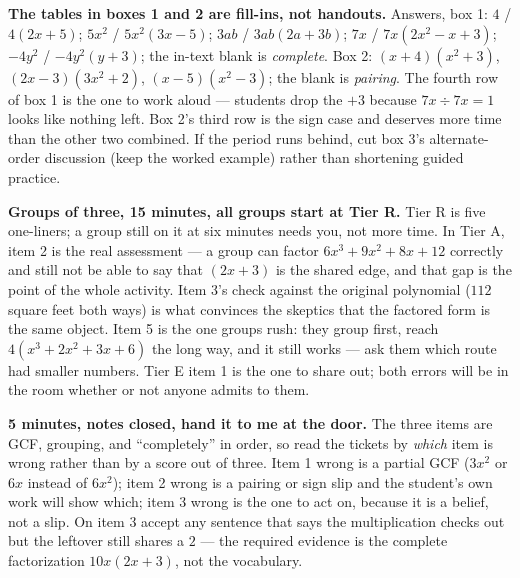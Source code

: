 \documentclass[10pt]{article}
\begin{document}
\begin{teachernote}
    \textbf{The tables in boxes 1 and 2 are fill-ins, not handouts.} Answers, box 1: $4$ /
    $4(2x+5)$; $5x^2$ / $5x^2(3x-5)$; $3ab$ / $3ab(2a+3b)$; $7x$ / $7x\left(2x^2-x+3\right)$;
    $-4y^2$ / $-4y^2(y+3)$; the in-text blank is \emph{complete}. Box 2: $(x+4)\left(x^2+3\right)$,
    $(2x-3)\left(3x^2+2\right)$, $(x-5)\left(x^2-3\right)$; the blank is \emph{pairing}. The fourth
    row of box 1 is the one to work aloud --- students drop the $+3$ because $7x \div 7x = 1$ looks
    like nothing left. Box 2's third row is the sign case and deserves more time than the other two
    combined. If the period runs behind, cut box 3's alternate-order discussion (keep the worked
    example) rather than shortening guided practice.
\end{teachernote}

\begin{teachernote}
    \textbf{Groups of three, 15 minutes, all groups start at Tier R.} Tier R is five one-liners; a
    group still on it at six minutes needs you, not more time. In Tier A, item 2 is the real
    assessment --- a group can factor $6x^3+9x^2+8x+12$ correctly and still not be able to say that
    $(2x+3)$ is the shared edge, and that gap is the point of the whole activity. Item 3's check
    against the original polynomial ($112$ square feet both ways) is what convinces the skeptics
    that the factored form is the same object. Item 5 is the one groups rush: they group first,
    reach $4\left(x^3+2x^2+3x+6\right)$ the long way, and it still works --- ask them which route
    had smaller numbers. Tier E item 1 is the one to share out; both errors will be in the room
    whether or not anyone admits to them.
\end{teachernote}

\begin{teachernote}
    \textbf{5 minutes, notes closed, hand it to me at the door.} The three items are GCF, grouping,
    and ``completely'' in order, so read the tickets by \emph{which} item is wrong rather than by a
    score out of three. Item 1 wrong is a partial GCF ($3x^2$ or $6x$ instead of $6x^2$); item 2
    wrong is a pairing or sign slip and the student's own work will show which; item 3 wrong is the
    one to act on, because it is a belief, not a slip. On item 3 accept any sentence that says the
    multiplication checks out but the leftover still shares a $2$ --- the required evidence is the
    complete factorization $10x(2x+3)$, not the vocabulary.
\end{teachernote}
\end{document}
